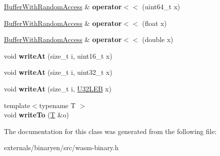 \begin{DoxyCompactItemize}
\item 
\mbox{\label{classwasm_1_1_buffer_with_random_access_ae03b980eacee3bf6cc87640ee25223e8}} 
\mbox{\hyperlink{classwasm_1_1_buffer_with_random_access}{Buffer\+With\+Random\+Access}} \& {\bfseries operator$<$$<$} (uint64\+\_\+t x)
\item 
\mbox{\label{classwasm_1_1_buffer_with_random_access_a40de91dc3c0de5206050812db2ed81ac}} 
\mbox{\hyperlink{classwasm_1_1_buffer_with_random_access}{Buffer\+With\+Random\+Access}} \& {\bfseries operator$<$$<$} (float x)
\item 
\mbox{\label{classwasm_1_1_buffer_with_random_access_a160fc221f1b08002b4a3afaeba938047}} 
\mbox{\hyperlink{classwasm_1_1_buffer_with_random_access}{Buffer\+With\+Random\+Access}} \& {\bfseries operator$<$$<$} (double x)
\item 
\mbox{\label{classwasm_1_1_buffer_with_random_access_a12088ff019d3bf3157306a1f8aed8530}} 
void {\bfseries write\+At} (size\+\_\+t i, uint16\+\_\+t x)
\item 
\mbox{\label{classwasm_1_1_buffer_with_random_access_ad9cfe546253353f7f76fef692641ffa0}} 
void {\bfseries write\+At} (size\+\_\+t i, uint32\+\_\+t x)
\item 
\mbox{\label{classwasm_1_1_buffer_with_random_access_a858c52d850e398ae5a2b17bc3a6dc1e7}} 
void {\bfseries write\+At} (size\+\_\+t i, \mbox{\hyperlink{structwasm_1_1_l_e_b}{U32\+L\+EB}} x)
\item 
\mbox{\label{classwasm_1_1_buffer_with_random_access_a3fafdd96bc756017b1716e4d4855ab50}} 
{\footnotesize template$<$typename T $>$ }\\void {\bfseries write\+To} (\mbox{\hyperlink{struct_t}{T}} \&o)
\end{DoxyCompactItemize}


The documentation for this class was generated from the following file\+:\begin{DoxyCompactItemize}
\item 
externals/binaryen/src/wasm-\/binary.\+h\end{DoxyCompactItemize}
